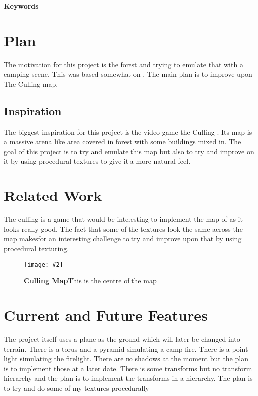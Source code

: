 \documentclass[10pt, a4paper]{article}
\title{\mytitle}
\author{\myauthor\hspace{1em}\\\contact\\Edinburgh Napier University\hspace{0.5em}-\hspace{0.5em}\mymodule}
\date{}
\newcommand{\figuremacro}[5]{
    \begin{figure}[#1]
        \centering
        \texttt{[image: \#2]}
        \caption[#3]{\textbf{#3}#4}
        \label{fig:#2}
    \end{figure}
}
\begin{document}
	\maketitle
	\begin{abstract}
		The goal of this project is too create a decent looking forest camping scene.  Some features that are implemented are a free camera, texturing on different geometry shapes and transforming those in order to get them in the right location and orientation.  Some features that will be implemented are spot lights, more cameras, shadows and some normal mapping.  This will be an interesting project as i am trying to recreate nature in 3d. 
	\end{abstract}
    
	\textbf{Keywords -- }{\mykeywords}
	\section{Plan}
	The motivation for this project is the forest and trying to emulate that with a camping scene.  
	This was based somewhat on \cite{Unity3D}.
	The main plan is to improve upon The Culling map.
	
	\subsection{Inspiration}
	The biggest inspiration for this project is the video game the Culling \cite{TheCulling}.
	Its map is a massive arena like area covered in forest with some buildings mixed in.
	The goal of this project is to try and emulate this map but also to try and improve on it by using procedural textures to give it a more natural feel.
	\section{Related Work}
	The culling is a game that would be interesting to implement the map of as it looks really good.  The fact that some of the textures look the same across the map makesfor an interesting challenge to try and improve upon that by using procedural texturing.
	\figuremacro{h}{Culling1}{Culling Map}{This is the centre of the map}{1.0}
	\section{Current and Future Features}
	The project itself uses a plane as the ground which will later be changed into terrain.  
	There is a torus and a pyramid simulating a camp-fire.  There is a point light simulating the firelight.
	There are no shadows at the moment but the plan is to implement those at a later date.  
	There is some transforms but no transform hierarchy and the plan is to implement the transforms in a hierarchy.
	The plan is to try and do some of my textures procedurally \cite{ProceduralTextures}
\end{document}
